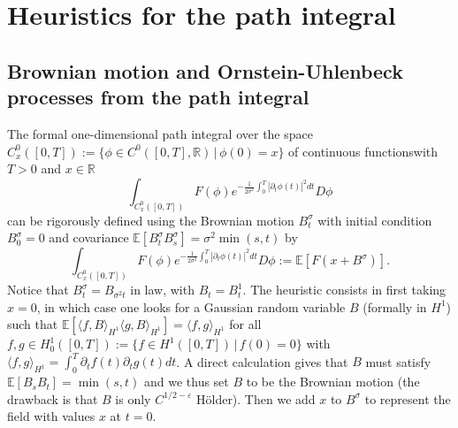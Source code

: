 \documentclass[11pt]{amsart}
\numberwithin{equation}{section}
\theoremstyle{definition}
\newcommand{\R}{\mathbb{R}}
\newcommand{\cjd}{\rangle}
\newcommand{\cjg}{\langle}
\def\E{\mathbb{E}}
\newcommand{\pl}{\partial}
\def\eps{\varepsilon}
\begin{document}
\appendix

\section{Heuristics for the path integral} \label{appendix: path integral}

\subsection{Brownian motion and Ornstein-Uhlenbeck processes from the path integral}\label{sec:Brownian_OU}

The formal one-dimensional path integral over the space $C^0_x([0,T]):=\{\phi \in C^0([0,T],\R)\,|\, \phi(0)=x\}$ of continuous functionswith $T>0$ and $x\in \R$
\begin{equation}\label{1dPathIntBM}
\int_{C^0_x([0,T])} F(\phi) e^{-\frac{1}{2 \sigma^2}\int_{0}^T |\pl_t\phi(t)|^2dt} D\phi
\end{equation}
can be rigorously defined using the Brownian motion $B^\sigma_t$ with initial condition $B^\sigma_0=0$ and covariance 
$\E[B_t^\sigma B^\sigma_s]=\sigma^2\min(s,t)$ by
\[\int_{C^0_x([0,T])} F(\phi) e^{-\frac{1}{2 \sigma^2}\int_{0}^T |\pl_t\phi(t)|^2dt} D\phi:=\E[F(x+B^\sigma)].\]
Notice that $B^\sigma_t=B_{\sigma^2t}$ in law, with $B_t=B^1_t$.
The heuristic consists in first taking $x=0$, in which case  one looks for a Gaussian random variable $B$ (formally in $H^1$) such that $\E[\cjg f,B\cjd_{H^1}\cjg g,B\cjd_{H^1}]=\cjg f,g\cjd_{H^1}$ for all 
$f,g\in H^1_0([0,T]):=\{f\in H^1([0,T])\,|\, f(0)=0\}$ with $\cjg f,g\cjd_{H^1}=\int_0^T\pl_tf(t)\pl_tg(t)dt$. A direct calculation 
gives that $B$ must satisfy $\E[B_sB_t]=\min(s,t)$  and we thus set $B$ to be the Brownian motion (the drawback is that $B$ is only $C^{1/2-\eps}$ H\"older). 
Then we add $x$ to $B^\sigma$ to represent the field with values $x$ at $t=0$.
\end{document}
